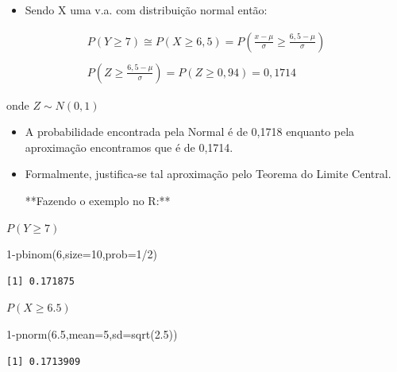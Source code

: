 \documentclass[
  letterpaper,
  DIV=11,
  numbers=noendperiod]{scrartcl}
\newenvironment{Shaded}{\begin{snugshade}}{\end{snugshade}}
\newcommand{\AttributeTok}[1]{\textcolor[rgb]{0.40,0.45,0.13}{#1}}
\newcommand{\DecValTok}[1]{\textcolor[rgb]{0.68,0.00,0.00}{#1}}
\newcommand{\FloatTok}[1]{\textcolor[rgb]{0.68,0.00,0.00}{#1}}
\newcommand{\FunctionTok}[1]{\textcolor[rgb]{0.28,0.35,0.67}{#1}}
\newcommand{\NormalTok}[1]{\textcolor[rgb]{0.00,0.23,0.31}{#1}}
\newcommand{\SpecialCharTok}[1]{\textcolor[rgb]{0.37,0.37,0.37}{#1}}
\providecommand{\tightlist}{%
  \setlength{\itemsep}{0pt}\setlength{\parskip}{0pt}}
\begin{document}
\begin{itemize}
\tightlist
\item
  Sendo X uma v.a. com distribuição normal então:
\end{itemize}

\[\begin{array}{ccc}
P(Y \geq 7) \cong P(X \geq 6,5)= P(\frac{x-\mu}{\sigma}\geq \frac{6,5-\mu}{\sigma})
\\
\\
P(Z \geq \frac{6,5-\mu}{\sigma})= P(Z \geq 0,94) = 0,1714
\end{array}\]

onde \(Z \sim N(0,1)\)

\begin{itemize}
\item
  A probabilidade encontrada pela Normal é de 0,1718 enquanto pela
  aproximação encontramos que é de 0,1714.
\item
  Formalmente, justifica-se tal aproximação pelo Teorema do Limite
  Central.

  \begin{tcolorbox}
  **Fazendo o exemplo no R:**
  \end{tcolorbox}
\end{itemize}

\(P(Y \geq 7)\)

\begin{Shaded}
\begin{Highlighting}[]
\DecValTok{1}\SpecialCharTok{{-}}\FunctionTok{pbinom}\NormalTok{(}\DecValTok{6}\NormalTok{,}\AttributeTok{size=}\DecValTok{10}\NormalTok{,}\AttributeTok{prob=}\DecValTok{1}\SpecialCharTok{/}\DecValTok{2}\NormalTok{)}
\end{Highlighting}
\end{Shaded}

\begin{verbatim}
[1] 0.171875
\end{verbatim}

\(P(X \geq 6.5)\)

\begin{Shaded}
\begin{Highlighting}[]
\DecValTok{1}\SpecialCharTok{{-}}\FunctionTok{pnorm}\NormalTok{(}\FloatTok{6.5}\NormalTok{,}\AttributeTok{mean=}\DecValTok{5}\NormalTok{,}\AttributeTok{sd=}\FunctionTok{sqrt}\NormalTok{(}\FloatTok{2.5}\NormalTok{))}
\end{Highlighting}
\end{Shaded}

\begin{verbatim}
[1] 0.1713909
\end{verbatim}
\end{document}

